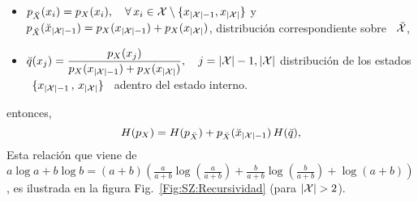 \begin{propiedades}
\begin{itemize}
  \item $p_{\breve{X}}(x_i) = p_X(x_i), \quad \forall \, x_i \in \mathcal{X} \setminus \{
      x_{|\mathcal{X}|-1} , x_{|\mathcal{X}|} \}$ \quad y \quad $p_{\breve{X}}(\breve{x}_{|\mathcal{X}|-1})
      = p_X(x_{|\mathcal{X}|-1}) + p_X(x_{|\mathcal{X}|})$, distribuci\'on correspondiente sobre \
      $\breve{\mathcal{X}}$,
  \item  $\displaystyle   \breve{q}(x_j)  =   \frac{p_X(x_j)}{p_X(x_{|\mathcal{X}|-1})  +
        p_X(x_{|\mathcal{X}|})},  \quad j  = |\mathcal{X}|-1,  |\mathcal{X}|$ \quad  distribuci\'on de  los
        estados  \ $\{  x_{|\mathcal{X}|-1} \,  , \,  x_{|\mathcal{X}|} \}$  \ adentro  del estado
        interno.
  \end{itemize}
  entonces,
  \[
  H(p_X)  =   H(p_{\breve{X}})  +  p_{\breve{X}}(\breve{x}_{|\mathcal{X}|-1})  \,
  H(\breve{q}),
  \]
  Esta relaci\'on que viene de $a \log  a + b  \log b = (a+b)  \left( \frac{a}{a+b}
    \log\left(  \frac{a}{a+b} \right)  + \frac{b}{a+b}  \log\left( \frac{b}{a+b}
    \right)   +  \log(  a   +   b  )\right)$,   es   ilustrada   en  la   figura
  Fig.~\ref{Fig:SZ:Recursividad} (para $|\mathcal{X}| > 2$).\newline

\end{propiedades}

